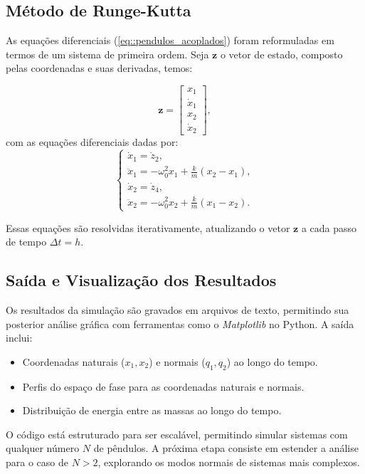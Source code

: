 \documentclass[a4paper, 11pt]{article}
\begin{document}
\subsection{Método de Runge-Kutta}

As equações diferenciais (\ref{eq::pendulos_acoplados}) foram reformuladas em termos de um sistema de primeira ordem. Seja $\mathbf{z}$ o vetor de estado, composto pelas coordenadas e suas derivadas, temos:

\begin{equation}
\mathbf{z} = \begin{bmatrix} x_1 \\ \dot{x}_1 \\ x_2 \\ \dot{x}_2 \end{bmatrix},
\end{equation}
com as equações diferenciais dadas por:
\begin{equation}
\begin{cases}
\dot{x}_1 = \dot{z}_2, \\
\ddot{x}_1 = -\omega_0^2 x_1 + \frac{k}{m}(x_2 - x_1), \\
\dot{x}_2 = \dot{z}_4, \\
\ddot{x}_2 = -\omega_0^2 x_2 + \frac{k}{m}(x_1 - x_2).
\end{cases}
\end{equation}

Essas equações são resolvidas iterativamente, atualizando o vetor $\mathbf{z}$ a cada passo de tempo $\Delta t=h$.

\subsection{Saída e Visualização dos Resultados}

Os resultados da simulação são gravados em arquivos de texto, permitindo sua posterior análise gráfica com ferramentas como o \textit{Matplotlib} no Python. A saída inclui:
\begin{itemize}
    \item Coordenadas naturais ($x_1, x_2$) e normais ($q_1, q_2$) ao longo do tempo.
    \item Perfis do espaço de fase para as coordenadas naturais e normais.
    \item Distribuição de energia entre as massas ao longo do tempo.
\end{itemize}

O código está estruturado para ser escalável, permitindo simular sistemas com qualquer número $N$ de pêndulos. A próxima etapa consiste em estender a análise para o caso de $N > 2$, explorando os modos normais de sistemas mais complexos.
\end{document}
